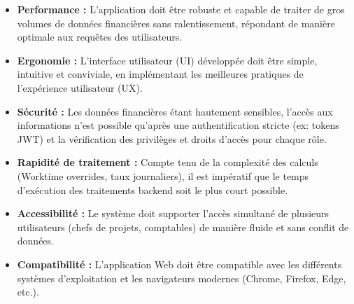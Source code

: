 \documentclass[12pt, a4paper, openany]{report}
\begin{document}
\begin{itemize}
    \setlength{\itemsep}{0.3cm} 
    \renewcommand{\labelitemi}{\textcolor{royalBlue}{\rule{1.2ex}{1.2ex}}}
    
    \vspace{-0.3cm}
    \item \textcolor{primaryBlue}{\textbf{Performance :}} L'application doit être robuste et capable de traiter de gros volumes de données financières sans ralentissement, répondant de manière optimale aux requêtes des utilisateurs.
    
    \vspace{-0.3cm}
    \item \textcolor{primaryBlue}{\textbf{Ergonomie :}} L'interface utilisateur (UI) développée doit être simple, intuitive et conviviale, en implémentant les meilleures pratiques de l'expérience utilisateur (UX).
    

    \vspace{-0.3cm}
    \item \textcolor{primaryBlue}{\textbf{Sécurité :}} Les données financières étant hautement sensibles, l'accès aux informations n'est possible qu'après une authentification stricte (ex: tokens JWT) et la vérification des privilèges et droits d'accès pour chaque rôle.
    
    \vspace{-0.3cm}
    \item \textcolor{primaryBlue}{\textbf{Rapidité de traitement :}} Compte tenu de la complexité des calculs (Worktime overrides, taux journaliers), il est impératif que le temps d'exécution des traitements backend soit le plus court possible.
    
    \vspace{-0.3cm}
    \item \textcolor{primaryBlue}{\textbf{Accessibilité :}} Le système doit supporter l'accès simultané de plusieurs utilisateurs (chefs de projets, comptables) de manière fluide et sans conflit de données.
    
    \vspace{-0.3cm}
    \item \textcolor{primaryBlue}{\textbf{Compatibilité :}} L'application Web doit être compatible avec les différents systèmes d'exploitation et les navigateurs modernes (Chrome, Firefox, Edge, etc.).
\end{itemize}

\vspace{-0.8cm}
\end{document}
